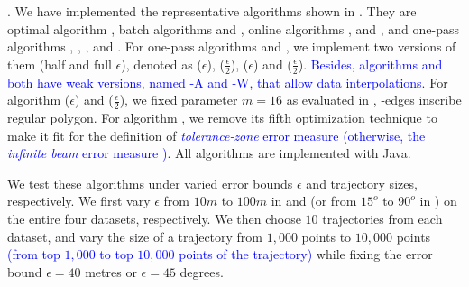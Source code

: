.
We have implemented the representative algorithms shown in .
 They are optimal algorithm \opt, batch algorithms \dpa and \tpa, online algorithms  \opwa, \bqsa and \squishe, and one-pass algorithms  \operb, \siped, \cised, \intersec and \interval.
For one-pass algorithms \siped and \cised, we implement two versions of them (half and full $\epsilon$), denoted as \siped($\epsilon$), \siped($\frac{\epsilon}{2}$), \cised($\epsilon$) and \cised($\frac{\epsilon}{2}$). 
\textcolor{blue}{Besides, algorithms \operb\cite{Lin:Operb} and \cised\cite{Lin:Cised} both have weak versions, named \operb-A and \cised-W, that allow data interpolations. } %
For algorithm \cised($\epsilon$) and \cised($\frac{\epsilon}{2}$), we fixed parameter $m=16$ as evaluated in \cite{Lin:Cised}, -edges inscribe regular polygon.
{For algorithm \operb, we remove its fifth optimization technique to make it fit for the definition of \textcolor{blue}{\emph{tolerance-zone} error measure \cite{Daescu:metric,Barequet:3D,Chen:Space,Imai:Optimal,Melkman:Optimal} (otherwise, the \emph{infinite beam} error measure \cite{Daescu:metric,Chen:Space})}.}
All algorithms are implemented with Java.


We test these algorithms under varied error bounds $\epsilon$ and trajectory sizes, respectively. We first vary $\epsilon$ from $10m$ to $100m$ in \ped and \sed (or from $15^o$ to $90^o$ in \dad) on the entire four datasets, respectively. We then choose $10$ trajectories from each dataset, and vary the size  of a trajectory from $1,000$ points to $10,000$ points \textcolor{blue}{(\ie from top $1,000$ to top $10,000$ points of the trajectory)} while fixing the error bound $\epsilon=40$ metres or $\epsilon=45$ degrees.

